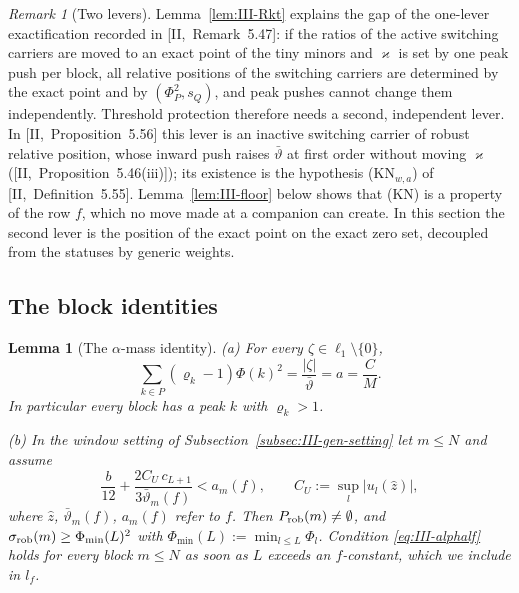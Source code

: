 \documentclass[10pt]{amsart}
\newtheorem{lemma}[theorem]{Lemma}
\theoremstyle{definition}
\theoremstyle{remark}
\newtheorem{remark}[theorem]{Remark}
\newcommand{\zh}{\hat z}
\begin{document}
\begin{remark}[Two levers]\label{rem:III-twolevers}
Lemma~\ref{lem:III-Rkt} explains the gap of the one-lever exactification
recorded in [II,~Remark~5.47]: if the ratios of the active switching
carriers are moved to an exact point of the tiny minors and $\varkappa$ is set
by one peak push per block, all relative positions of the switching carriers
are determined by the exact point and by $(\Phi_P^2,s_Q)$, and peak pushes
cannot change them independently.  Threshold protection therefore needs a
second, independent lever.  In [II,~Proposition~5.56] this lever is an
inactive switching carrier of robust relative position, whose inward push
raises $\bar\vartheta$ at first order without moving $\varkappa$
([II,~Proposition~5.46(iii)]); its existence is the hypothesis
(KN$_{w,a}$) of [II,~Definition~5.55].  Lemma~\ref{lem:III-floor} below
shows that (KN) is a property of the row $f$, which no move made at a
companion can create.  In this section the second lever is the position of
the exact point on the exact zero set, decoupled from the statuses by
generic weights.
\end{remark}

\subsection{The block identities}\label{subsec:III-blockid}

\begin{lemma}[The $\alpha$-mass identity]\label{lem:III-alpha}
\textup{(a)} For every $\zeta\in\ell_1\setminus\{0\}$,
\[
 \sum_{k\in P}(\varrho_k-1)\Phi(k)^2=\frac{|\zeta|}{\bar\vartheta}=a=\frac CM .
\]
In particular every block has a peak $k$ with $\varrho_k>1$.

\textup{(b)} In the window setting of
Subsection~\textup{\ref{subsec:III-gen-setting}} let $m\le N$ and assume
\begin{equation}\label{eq:III-alphalf}
 \frac b{12}+\frac{2C_U\,c_{L+1}}{3\bar\vartheta_m(f)}<a_m(f),\qquad
 C_U:=\sup_l|u_l(\zh)| ,
\end{equation}
where $\zh$, $\bar\vartheta_m(f)$, $a_m(f)$ refer to $f$.  Then $P_{\rm rob}(m)
\ne\emptyset$, and $\sigma_{\rm rob}(m)\ge\Phi_{\min}(L)^2$ with $\Phi_{\min}(L):=
\min_{l\le L}\Phi_l$.  Condition \eqref{eq:III-alphalf} holds for every block
$m\le N$ as soon as $L$ exceeds an $f$-constant, which we include in $l_f$.
\end{lemma}
\end{document}
